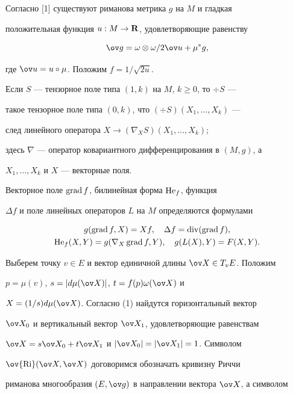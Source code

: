 Согласно [1] существуют риманова метрика $g$ на $M$ и гладкая


положительная функция $u:M\to{\bold R}$, удовлетворяющие равенству


\begin{equation}


\ov g=\omega\otimes\omega/2\ov u+\mu^{*}g,


\end{equation}


где $\ov u=u\circ\mu$. Положим $f=1/\sqrt{2u}$.





Если $S$ --- тензорное поле типа $(1,k)$ на $M$, $k\ge0$, то $\div S$ ---


такое тензорное поле типа $(0,k)$, что $(\div S)(X_1,\dots,X_k)$ ---


след линейного оператора $X\to(\nabla_X S)(X_1,\dotsc,X_k)$;


здесь $\nabla$ --- оператор ковариантного дифференцирования в $(M,g)$, а


$X_1,\dotsc,X_k$ и $X$ --- векторные поля.


Векторное поле $\operatorname{grad} f$, билинейная форма $\operatorname{He}_f$, функция


$\Delta f$ и поле линейных операторов $L$ на $M$ определяются формулами


\begin{gather*}


g(\grad f,X)=Xf,\quad \Delta f=\div(\grad f),\\


\He_f(X,Y)=g(\nabla_{X}\grad f,Y),\quad g(L(X),Y)=F(X,Y).


\end{gather*}





Выберем точку $v\in E$ и вектор единичной длины $\ov X\in T_v E$. Положим


$p=\mu(v)$, $s=|d\mu(\ov X)|$, $t=f(p)\omega(\ov X)$ и


$X=(1/s)d\mu(\ov X)$. Согласно (1) найдутся горизонтальный вектор


$\ov X_{0}$ и вертикальный вектор $\ov X_{1}$, удовлетворяющие равенствам


$\ov X=s\ov X_0+t\ov X_1$ и $|\ov X_0|=|\ov X_1|=1$. Символом


$\ov{\Ri}(\ov X,\ov X)$ договоримся обозначать кривизну Риччи


риманова многообразия $(E,\g)$ в направлении вектора $\ov X$, а символом


